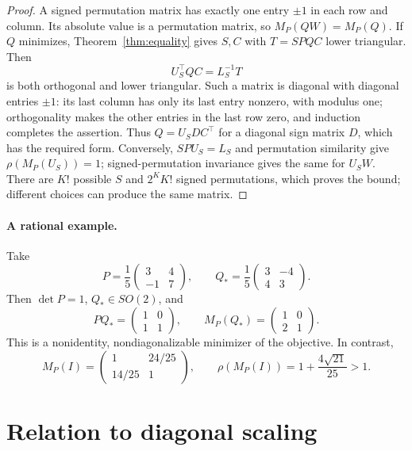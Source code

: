 \documentclass[11pt]{article}
\begin{document}
\begin{proof}
A signed permutation matrix has exactly one entry $\pm1$ in each row
and column. Its absolute value is a permutation matrix, so
$M_P(QW)=M_P(Q)$.
If $Q$ minimizes, Theorem~\ref{thm:equality} gives $S,C$ with
$T=SPQC$ lower triangular. Then
\[
 U_S^\top QC=L_S^{-1}T
\]
is both orthogonal and lower triangular. Such a matrix is diagonal with
diagonal entries $\pm1$: its last column has only its last entry
nonzero, with modulus one; orthogonality makes the other entries in the
last row zero, and induction completes the assertion.
Thus $Q=U_SDC^\top$ for a diagonal sign matrix $D$, which has the required
form. Conversely, $SPU_S=L_S$ and permutation similarity give
$\rho(M_P(U_S))=1$; signed-permutation invariance gives the same for
$U_SW$. There are $K!$ possible $S$ and $2^K K!$ signed permutations,
which proves the bound; different choices can produce the same matrix.
\end{proof}

\paragraph{A rational example.}
Take
\[
 P=\frac15\begin{pmatrix}3&4\\-1&7\end{pmatrix},\qquad
 Q_*=\frac15\begin{pmatrix}3&-4\\4&3\end{pmatrix}.
\]
Then $\det P=1$, $Q_*\in SO(2)$, and
\[
 PQ_*=\begin{pmatrix}1&0\\1&1\end{pmatrix},\qquad
 M_P(Q_*)=\begin{pmatrix}1&0\\2&1\end{pmatrix}.
\]
This is a nonidentity, nondiagonalizable minimizer of the objective.
In contrast,
\[
 M_P(I)=\begin{pmatrix}1&24/25\\14/25&1\end{pmatrix},\qquad
 \rho(M_P(I))=1+\frac{4\sqrt{21}}{25}>1.
\]

\section{Relation to diagonal scaling}
\end{document}
